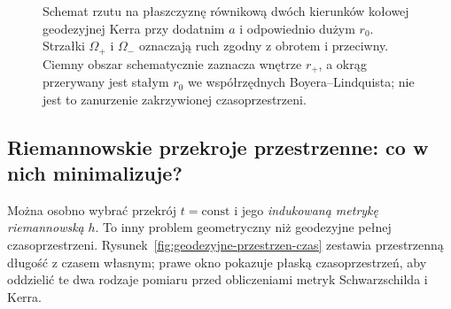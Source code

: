 \begin{figure}[htbp]
\centering
{}
\caption{Schemat rzutu na płaszczyznę równikową dwóch kierunków kołowej geodezyjnej Kerra przy dodatnim $a$ i odpowiednio dużym $r_0$. Strzałki $\Omega_+$ i $\Omega_-$ oznaczają ruch zgodny z obrotem i przeciwny. Ciemny obszar schematycznie zaznacza wnętrze $r_+$, a okrąg przerywany jest stałym $r_0$ we współrzędnych Boyera--Lindquista; nie jest to zanurzenie zakrzywionej czasoprzestrzeni.}
\label{fig:geodezyjna-kerr-kolowa}
\end{figure}

\subsection*{Riemannowskie przekroje przestrzenne: co w nich minimalizuje?}
\label{subsec:przekroje-przestrzenne-geodezyjne}

Można osobno wybrać przekrój $t=\mathrm{const}$
i jego \emph{indukowaną metrykę riemannowską}
$h$. To inny problem geometryczny niż
geodezyjne pełnej czasoprzestrzeni.
Rysunek~\ref{fig:geodezyjne-przestrzen-czas} zestawia
przestrzenną długość z czasem własnym; prawe okno
pokazuje płaską czasoprzestrzeń, aby oddzielić te
dwa rodzaje pomiaru przed obliczeniami metryk
Schwarzschilda i Kerra.

